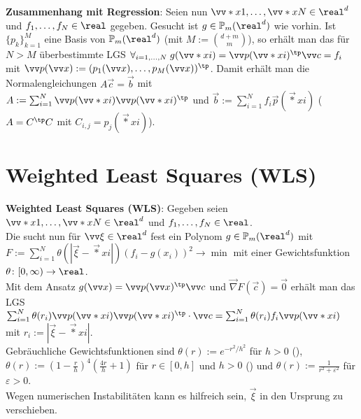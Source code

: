 \textbf{Zusammenhang mit Regression}:
Seien nun $\vec*{x}{1}, \dotsc, \vec*{x}{N} \in \real^d$ und $f_1, \dotsc, f_N \in \real$
gegeben.
Gesucht ist $g \in \PP_m(\real^d)$ wie vorhin.
Ist $\{p_k\}_{k=1}^M$ eine Basis von $\PP_m(\real^d)$
(mit $M := \binom{d+m}{m}$),
so erhält man das für $N > M$ überbestimmte LGS
$\forall_{i=1,\dotsc,N}\; g(\vec*{x}{i}) = \vec{p}(\vec*{x}{i})^\tp \vec{c} = f_i$
mit $\vec{p}(\vec{x}) := (p_1(\vec{x}), \dotsc, p_M(\vec{x}))^\tp$.
Damit erhält man die Normalengleichungen
$A\vec{c} = \vec{b}$ mit\\
$A := \sum_{i=1}^N \vec{p}(\vec*{x}{i}) \vec{p}(\vec*{x}{i})^\tp$ und
$\vec{b} := \sum_{i=1}^N f_i \vec{p}(\vec*{x}{i})$
($A = C^\tp C$ mit $C_{i,j} = p_j(\vec*{x}{i})$).

\section{%
    Weighted Least Squares (WLS)%
}

\textbf{Weighted Least Squares (WLS)}:
Gegeben seien $\vec*{x}{1}, \dotsc, \vec*{x}{N} \in \real^d$ und
$f_1, \dotsc, f_N \in \real$.\\
Die  sucht nun für $\vec{\xi} \in \real^d$ fest
ein Polynom $g \in \PP_m(\real^d)$ mit\\
$F := \sum_{i=1}^N \theta(|\vec{\xi} - \vec*{x}{i}|) (f_i - g(x_i))^2 \to \min$
mit einer Gewichtsfunktion $\theta\colon [0, \infty) \to \real$.\\
Mit dem Ansatz $g(\vec{x}) = \vec{p}(\vec{x})^\tp \vec{c}$ und
$\vec{\nabla} F(\vec{c}) = \vec{0}$ erhält man das LGS\\
$\sum_{i=1}^N \theta(r_i) \vec{p}(\vec*{x}{i}) \vec{p}(\vec*{x}{i})^\tp \cdot \vec{c}
= \sum_{i=1}^N \theta(r_i) f_i \vec{p}(\vec*{x}{i})$ mit $r_i := |\vec{\xi} - \vec*{x}{i}|$.\\
Gebräuchliche Gewichtsfunktionen sind
$\theta(r) := e^{-r^2/h^2}$ für $h > 0$ (),\\
$\theta(r) := (1 - \frac{r}{h})^4 (\frac{4r}{h} + 1)$ für $r \in [0, h]$ und $h > 0$
() und
$\theta(r) := \frac{1}{r^2 + \varepsilon^2}$ für $\varepsilon > 0$.\\
Wegen numerischen Instabilitäten kann es hilfreich sein,
$\vec{\xi}$ in den Ursprung zu verschieben.

\linie

